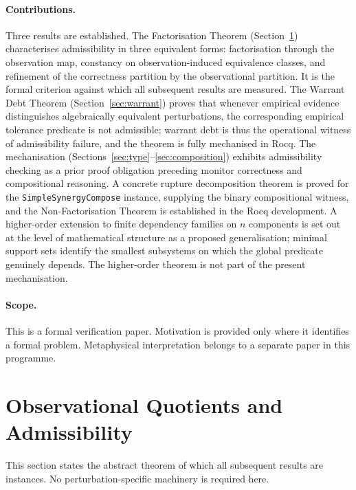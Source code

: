 \documentclass[12pt]{article}
\theoremstyle{plain}
\theoremstyle{definition}
\theoremstyle{remark}
\begin{document}
\paragraph{Contributions.}
Three results are established.
The Factorisation Theorem (Section~\ref{sec:quotients}) characterises
admissibility in three equivalent forms: factorisation through the
observation map, constancy on observation-induced equivalence classes,
and refinement of the correctness partition by the observational
partition.
It is the formal criterion against which all subsequent results are
measured.
The Warrant Debt Theorem (Section~\ref{sec:warrant}) proves that
whenever empirical evidence distinguishes algebraically equivalent
perturbations, the corresponding empirical tolerance predicate is not
admissible; warrant debt is thus the operational witness of
admissibility failure, and the theorem is fully mechanised in Rocq.
The mechanisation (Sections~\ref{sec:type}--\ref{sec:composition})
exhibits admissibility checking as a prior proof obligation preceding
monitor correctness and compositional reasoning. A concrete rupture
decomposition theorem is proved for the \texttt{SimpleSynergyCompose}
instance, supplying the binary compositional witness, and the
Non-Factorisation Theorem is established in the Rocq development. A
higher-order extension to finite dependency families on $n$
components is set out at the level of mathematical structure as a
proposed generalisation; minimal support sets identify the smallest
subsystems on which the global predicate genuinely depends. The
higher-order theorem is not part of the present mechanisation.

\paragraph{Scope.}
This is a formal verification paper.
Motivation is provided only where it identifies a formal problem.
Metaphysical interpretation belongs to a separate paper in this
programme.

\section{Observational Quotients and Admissibility}
\label{sec:quotients}

This section states the abstract theorem of which all subsequent
results are instances.
No perturbation-specific machinery is required here.
\end{document}
